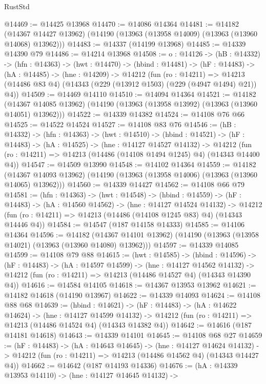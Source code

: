 \begin{lexlean}{RustStd}
\begin{coremodule}
@14469 := @14425 @13968
@14470 := @14086 @14364
@14481 := @14182
    (@14367 @14427 @13962)
    (@14190 (@13963 (@13958 @14009) (@13963 (@13960 @14068) @13962)))
@14483 := @14337 (@14199 @13968)
@14485 := @14339 @14390 @79
@14486 := @14214 @13968
@14508 := {o : @14126} ->
  (hB : @14332) ->
  (hfn : @14363) ->
  (hwt : @14470) ->
  (hbind : @14481) ->
  (hF : @14483) ->
  (hA : @14485) ->
  (hne : @14209) ->
  @14212
    (fun (ro : @14211) =>
    @14213 (@14486 @83 @4) (@14343 (@229 (@13912 @1503) (@229 (@4947 @1494) @21)) @4))
@14509 := @14469 @14110
@14510 := @14094 @14364
@14521 := @14182
    (@14367 @14085 @13962)
    (@14190 (@13963 (@13958 @13992) (@13963 (@13960 @14051) @13962)))
@14522 := @14339 @14382
@14524 := @14108 @76 @66
@14525 := @14522 @14524
@14527 := @14108 @83 @76
@14546 := (hB : @14332) ->
  (hfn : @14363) ->
  (hwt : @14510) ->
  (hbind : @14521) ->
  (hF : @14483) ->
  (hA : @14525) ->
  (hne : @14127 @14527 @14132) ->
  @14212 (fun (ro : @14211) => @14213 (@14486 (@14108 @1494 @1245) @4) (@14343 @14400 @4))
@14547 := @14509 @13990
@14548 := @14102 @14364
@14559 := @14182
    (@14367 @14093 @13962)
    (@14190 (@13963 (@13958 @14006) (@13963 (@13960 @14065) @13962)))
@14560 := @14339 @14427
@14562 := @14108 @66 @79
@14581 := (hfn : @14363) ->
  (hwt : @14548) ->
  (hbind : @14559) ->
  (hF : @14483) ->
  (hA : @14560 @14562) ->
  (hne : @14127 @14524 @14132) ->
  @14212 (fun (ro : @14211) => @14213 (@14486 (@14108 @1245 @83) @4) (@14343 @14446 @4))
@14584 := @14547 (@187 @14158 @14333)
@14585 := @14106 @14364
@14596 := @14182
    (@14367 @14101 @13962)
    (@14190 (@13963 (@13958 @14021) (@13963 (@13960 @14080) @13962)))
@14597 := @14339 @14085
@14599 := @14108 @79 @88
@14615 := (hwt : @14585) ->
  (hbind : @14596) ->
  (hF : @14483) ->
  (hA : @14597 @14599) ->
  (hne : @14127 @14562 @14132) ->
  @14212 (fun (ro : @14211) => @14213 (@14486 @14527 @4) (@14343 @14390 @4))
@14616 := @14584 @14105
@14618 := @14367 @13953 @13962
@14621 := @14182 @14618 (@14190 @13967)
@14622 := @14339 @14093
@14624 := @14108 @88 @68
@14639 := (hbind : @14621) ->
  (hF : @14483) ->
  (hA : @14622 @14624) ->
  (hne : @14127 @14599 @14132) ->
  @14212 (fun (ro : @14211) => @14213 (@14486 @14524 @4) (@14343 @14382 @4))
@14642 := @14616 (@187 @14181 @14618)
@14643 := @14339 @14101
@14645 := @14108 @68 @27
@14659 := (hF : @14483) ->
  (hA : @14643 @14645) ->
  (hne : @14127 @14624 @14132) ->
  @14212 (fun (ro : @14211) => @14213 (@14486 @14562 @4) (@14343 @14427 @4))
@14662 := @14642 (@187 @14193 @14336)
@14676 := (hA : @14339 @13953 @14110) ->
  (hne : @14127 @14645 @14132) ->

\end{coremodule}
\end{lexlean}
